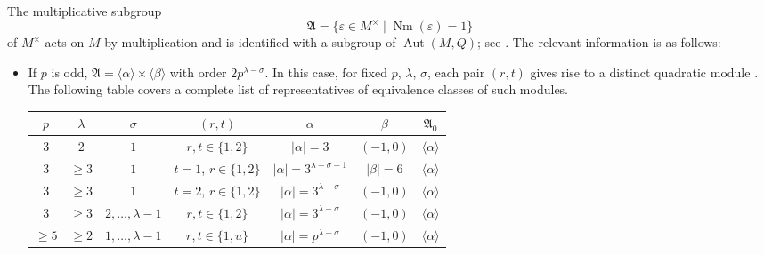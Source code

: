 \documentclass[a4paper,11pt]{report}
\begin{document}
{{{ The multiplicative subgroup 
\[\mathfrak{A} = \{\varepsilon \in M^\times \mid \operatorname{Nm}(\varepsilon)
= 1 \}\]
 of $M^\times$ acts on $M$ by multiplication and is identified with a subgroup of $\operatorname{Aut}(M,Q)$; see \cite[Section 2.3 - 2.4]{NW76}. The relevant information is as follows: 
\begin{itemize}
\item If $p$ is odd, $\mathfrak{A} = \langle\alpha\rangle \times \langle\beta\rangle$ with order $2p^{\lambda-\sigma}$. In this case, for fixed $p$, $\lambda$, $\sigma$, each pair $(r,t)$ gives rise to a distinct quadratic module \cite[Satz 4]{Nobs1}. The following table covers a complete list of representatives of equivalence
classes of such modules. \begin{center}
\begin{tabular}{ccccccc}$p$&
$\lambda$&
$\sigma$&
$(r,t)$&
$\alpha$&
$\beta$&
$\mathfrak{A}_0$\\
\hline
$3$&
$2$&
$1$&
$r,t \in \{1,2\}$&
$|\alpha| = 3$&
$(-1,0)$&
$\langle \alpha \rangle$\\
$3$&
$\geq 3$&
$1$&
$t=1$, $r \in \{1,2\}$&
$|\alpha| = 3^{\lambda-\sigma-1}$&
$|\beta| = 6$&
$\langle \alpha \rangle$\\
$3$&
$\geq 3$&
$1$&
$t=2$, $r \in \{1,2\}$&
$|\alpha| = 3^{\lambda-\sigma}$&
$(-1,0)$&
$\langle \alpha \rangle$\\
$3$&
$\geq 3$&
$2,\dots,\lambda-1$&
$r,t \in \{1,2\}$&
$|\alpha| = 3^{\lambda-\sigma}$&
$(-1,0)$&
$\langle \alpha \rangle$\\
$\geq 5$&
$\geq 2$&
$1, \dots,\lambda - 1$&
$r,t \in \{1,u\}$&
$|\alpha| = p^{\lambda-\sigma}$&
$(-1,0)$&
$\langle \alpha \rangle$\\
\end{tabular}\\[2mm]
\end{center}



\end{itemize}}}}
\end{document}
